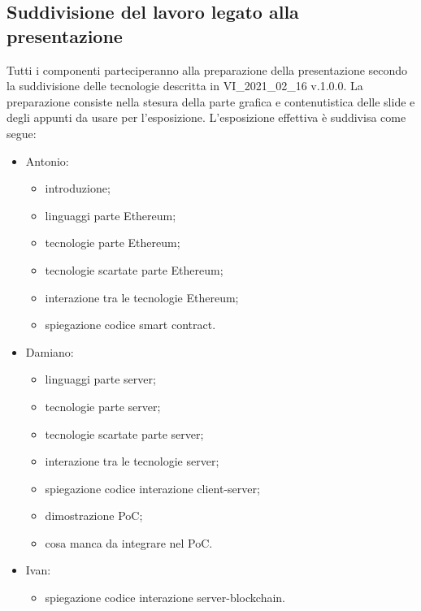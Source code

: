 \subsection*{Suddivisione del lavoro legato alla presentazione}
Tutti i componenti parteciperanno alla preparazione della presentazione secondo la suddivisione delle tecnologie descritta in VI\_2021\_02\_16 v.1.0.0. La preparazione consiste nella stesura della parte grafica e contenutistica delle slide e degli appunti da usare per l'esposizione. L'esposizione effettiva è suddivisa come segue:
\begin{itemize}
	\item Antonio:
	\begin{itemize}
		\item introduzione;
		\item linguaggi parte Ethereum;
		\item tecnologie parte Ethereum;
		\item tecnologie scartate parte Ethereum;
		\item interazione tra le tecnologie Ethereum;
		\item spiegazione codice smart contract.
	\end{itemize}
	\item Damiano:
	\begin{itemize}
		\item linguaggi parte server;
		\item tecnologie parte server;
		\item tecnologie scartate parte server;
		\item interazione tra le tecnologie server;
		\item spiegazione codice interazione client-server;
		\item dimostrazione PoC;
		\item cosa manca da integrare nel PoC.
	\end{itemize}
	\item Ivan:
	\begin{itemize}
		\item spiegazione codice interazione server-blockchain.
	\end{itemize}
\end{itemize}
